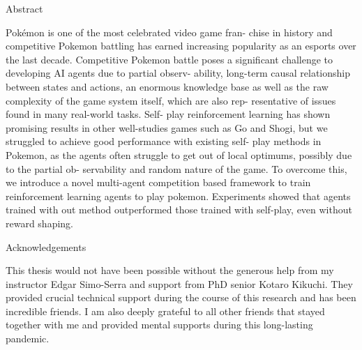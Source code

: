 \documentclass[a4paper, oneside, uplatex, 12pt]{book}
\begin{document}
\pagebreak
\hspace{0pt}
\vfill %
    \begin{center}
    Abstract
    \end{center}
Pokémon is one of the most celebrated video game fran-
chise in history and competitive Pokemon battling has
earned increasing popularity as an esports over the last
decade. Competitive Pokemon battle poses a significant
challenge to developing AI agents due to partial observ-
ability, long-term causal relationship between states and
actions, an enormous knowledge base as well as the raw
complexity of the game system itself, which are also rep-
resentative of issues found in many real-world tasks. Self-
play reinforcement learning has shown promising results
in other well-studies games such as Go and Shogi, but we
struggled to achieve good performance with existing self-
play methods in Pokemon, as the agents often struggle to
get out of local optimums, possibly due to the partial ob-
servability and random nature of the game. To overcome
this, we introduce a novel multi-agent competition based
framework to train reinforcement learning agents to play
pokemon. Experiments showed that agents trained with
out method outperformed those trained with self-play,
even without reward shaping.
\vfill
\pagebreak

\pagebreak
\hspace{0pt}
\vfill 
    \begin{center}
    Acknowledgements
    \end{center}
This thesis would not have been possible without the generous help from my
instructor Edgar Simo-Serra and support from PhD senior Kotaro Kikuchi. They
provided crucial technical support during the course of this research and has
been incredible friends. I am also deeply grateful to all other friends that
stayed together with me and provided mental supports during this long-lasting
pandemic.

\vfill
\pagebreak


\tableofcontents
\listoffigures 
\listoftables

\clearpage






\end{document}
